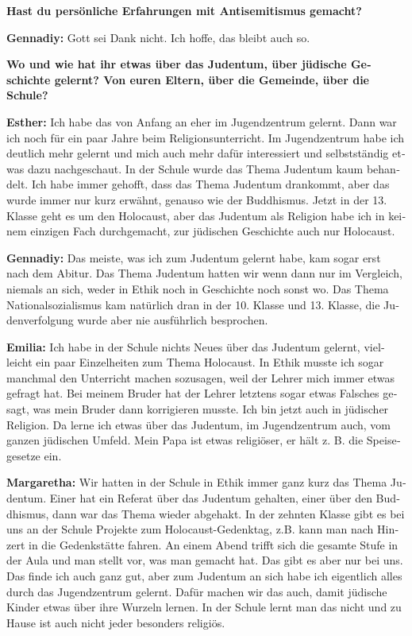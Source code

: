 \begin{otherlanguage}{ngerman}
\textbf{Hast du persönliche Erfahrungen mit Antisemitismus gemacht?} 

\textbf{Gennadiy:} Gott sei Dank nicht. Ich hoffe, das bleibt auch so.  

\textbf{Wo und wie hat ihr etwas über das Judentum, über jüdische Geschichte gelernt? Von euren Eltern, über die Gemeinde, über die Schule?} 

\textbf{Esther:} Ich habe das von Anfang an eher im Jugendzentrum gelernt. Dann war ich noch für ein paar Jahre beim Religionsunterricht. Im Jugendzentrum habe ich deutlich mehr gelernt und mich auch mehr dafür interessiert und selbstständig etwas dazu nachgeschaut. In der Schule wurde das Thema Judentum kaum behandelt. Ich habe immer gehofft, dass das Thema Judentum drankommt, aber das wurde immer nur kurz erwähnt, genauso wie der Buddhismus. Jetzt in der 13. Klasse geht es um den Holocaust, aber das Judentum als Religion habe ich in keinem einzigen Fach durchgemacht, zur jüdischen Geschichte auch nur Holocaust. 

\textbf{Gennadiy:} Das meiste, was ich zum Judentum gelernt habe, kam sogar erst nach dem Abitur. Das Thema Judentum hatten wir wenn dann nur im Vergleich, niemals an sich, weder in Ethik noch in Geschichte noch sonst wo. Das Thema Nationalsozialismus kam natürlich dran in der 10. Klasse und 13. Klasse, die Judenverfolgung wurde aber nie ausführlich besprochen. %

\textbf{Emilia:} Ich habe in der Schule nichts Neues über das Judentum gelernt, vielleicht ein paar Einzelheiten zum Thema Holocaust. In Ethik musste ich sogar manchmal den Unterricht machen sozusagen, weil der Lehrer mich immer etwas gefragt hat. Bei meinem Bruder hat der Lehrer letztens sogar etwas Falsches gesagt, was mein Bruder dann korrigieren musste. Ich bin jetzt auch in jüdischer Religion. Da lerne ich etwas über das Judentum, im Jugendzentrum auch, vom ganzen jüdischen Umfeld. Mein Papa ist etwas religiöser, er hält z. B. die Speisegesetze ein. 

\textbf{Margaretha:} Wir hatten in der Schule in Ethik immer ganz kurz das Thema Judentum. Einer hat ein Referat über das Judentum gehalten, einer über den Buddhismus, dann war das Thema wieder abgehakt. In der zehnten Klasse gibt es bei uns an der Schule Projekte zum Holocaust-Gedenktag, z.B. kann man nach Hinzert in die Gedenkstätte fahren. An einem Abend trifft sich die gesamte Stufe in der Aula und man stellt vor, was man gemacht hat. Das gibt es aber nur bei uns. Das finde ich auch ganz gut, aber zum Judentum an sich habe ich eigentlich alles durch das Jugendzentrum gelernt. Dafür machen wir das auch, damit jüdische Kinder etwas über ihre Wurzeln lernen. In der Schule lernt man das nicht und zu Hause ist auch nicht jeder besonders religiös. 


\end{otherlanguage}
